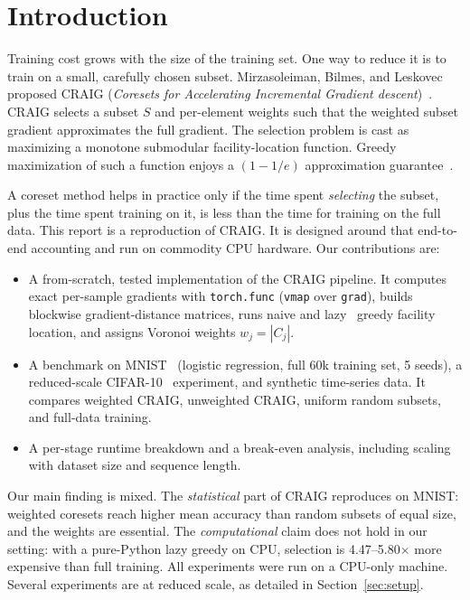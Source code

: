 \documentclass[conference]{IEEEtran}
\begin{document}
\section{Introduction}
Training cost grows with the size of the training set. One way to reduce it is to train on a small, carefully chosen subset. Mirzasoleiman, Bilmes, and Leskovec proposed CRAIG (\emph{Coresets for Accelerating Incremental Gradient descent})~\cite{mirzasoleiman2020craig}. CRAIG selects a subset $S$ and per-element weights such that the weighted subset gradient approximates the full gradient. The selection problem is cast as maximizing a monotone submodular facility-location function. Greedy maximization of such a function enjoys a $(1-1/e)$ approximation guarantee~\cite{nemhauser1978analysis}.

A coreset method helps in practice only if the time spent \emph{selecting} the subset, plus the time spent training on it, is less than the time for training on the full data. This report is a reproduction of CRAIG. It is designed around that end-to-end accounting and run on commodity CPU hardware. Our contributions are:
\begin{itemize}
\item A from-scratch, tested implementation of the CRAIG pipeline. It computes exact per-sample gradients with \texttt{torch.func} (\texttt{vmap} over \texttt{grad}), builds blockwise gradient-distance matrices, runs naive and lazy~\cite{minoux1978accelerated} greedy facility location, and assigns Voronoi weights $w_j=|C_j|$.
\item A benchmark on MNIST~\cite{lecun1998gradient} (logistic regression, full 60k training set, 5 seeds), a reduced-scale CIFAR-10~\cite{krizhevsky2009learning} experiment, and synthetic time-series data. It compares weighted CRAIG, unweighted CRAIG, uniform random subsets, and full-data training.
\item A per-stage runtime breakdown and a break-even analysis, including scaling with dataset size and sequence length.
\end{itemize}
Our main finding is mixed. The \emph{statistical} part of CRAIG reproduces on MNIST: weighted coresets reach higher mean accuracy than random subsets of equal size, and the weights are essential. The \emph{computational} claim does not hold in our setting: with a pure-Python lazy greedy on CPU, selection is 4.47--5.80$\times$ more expensive than full training. All experiments were run on a CPU-only machine. Several experiments are at reduced scale, as detailed in Section~\ref{sec:setup}.
\end{document}
